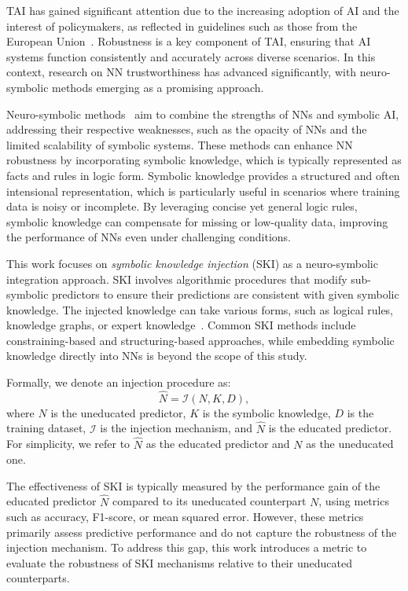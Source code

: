 %
\Gls{TAI} has gained significant attention due to the increasing adoption of \gls{AI} and the interest of policymakers, as reflected in guidelines such as those from the European Union~\cite{placeholder}.
%
Robustness is a key component of \gls{TAI}, ensuring that \gls{AI} systems function consistently and accurately across diverse scenarios.
%
In this context, research on \gls{NN} trustworthiness has advanced significantly, with neuro-symbolic methods emerging as a promising approach.

%
Neuro-symbolic methods~\cite{placeholder} aim to combine the strengths of \glspl{NN} and symbolic \gls{AI}, addressing their respective weaknesses, such as the opacity of \glspl{NN} and the limited scalability of symbolic systems.
%
These methods can enhance \gls{NN} robustness by incorporating symbolic knowledge, which is typically represented as facts and rules in logic form.
%
Symbolic knowledge provides a structured and often intensional representation, which is particularly useful in scenarios where training data is noisy or incomplete.
%
By leveraging concise yet general logic rules, symbolic knowledge can compensate for missing or low-quality data, improving the performance of \glspl{NN} even under challenging conditions.

%
This work focuses on \emph{symbolic knowledge injection} (\gls{SKI}) as a neuro-symbolic integration approach.
%
\Gls{SKI} involves algorithmic procedures that modify sub-symbolic predictors to ensure their predictions are consistent with given symbolic knowledge.
%
The injected knowledge can take various forms, such as logical rules, knowledge graphs, or expert knowledge~\cite{placeholder}.
%
Common \gls{SKI} methods include constraining-based and structuring-based approaches, while embedding symbolic knowledge directly into \glspl{NN} is beyond the scope of this study.

%
Formally, we denote an injection procedure as:
%
\begin{equation}
    \hat{N} = \mathcal{I}(N, K, D),
\end{equation}
%
where \(N\) is the uneducated predictor, \(K\) is the symbolic knowledge, \(D\) is the training dataset, \(\mathcal{I}\) is the injection mechanism, and \(\hat{N}\) is the educated predictor.
%
For simplicity, we refer to \(\hat{N}\) as the educated predictor and \(N\) as the uneducated one.

%
The effectiveness of \gls{SKI} is typically measured by the performance gain of the educated predictor \(\hat{N}\) compared to its uneducated counterpart \(N\), using metrics such as accuracy, F1-score, or mean squared error.
%
However, these metrics primarily assess predictive performance and do not capture the robustness of the injection mechanism.
%
To address this gap, this work introduces a metric to evaluate the robustness of \gls{SKI} mechanisms relative to their uneducated counterparts.


